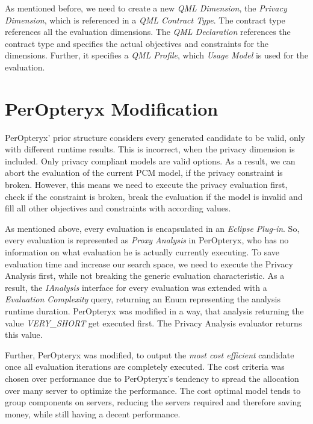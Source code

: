 As mentioned before, we need to create a new \textit{QML Dimension}, the \textit{Privacy Dimension}, which is referenced in a \textit{QML Contract Type}. The contract type references all the evaluation dimensions. The \textit{QML Declaration} references the contract type and specifies the actual objectives and constraints for the dimensions. Further, it specifies a \textit{QML Profile}, which \textit{Usage Model} is used for the evaluation.


\section{PerOpteryx Modification}

PerOpteryx' prior structure considers every generated candidate to be valid, only with different runtime results. This is incorrect, when the privacy dimension is included. Only privacy compliant models are valid options. As a result, we can abort the evaluation of the current PCM model, if the privacy constraint is broken. However, this means we need to execute the privacy evaluation first, check if the constraint is broken, break the evaluation if the model is invalid and fill all other objectives and constraints with according values.

As mentioned above, every evaluation is encapsulated in an \textit{Eclipse Plug-in}. So, every evaluation is represented as \textit{Proxy Analysis} in PerOpteryx, who has no information on what evaluation he is actually currently executing. To save evaluation time and increase our search space, we need to execute the Privacy Analysis first, while not breaking the generic evaluation characteristic. As a result, the \textit{IAnalysis} interface for every evaluation was extended with a \textit{Evaluation Complexity} query, returning an Enum representing the analysis runtime duration. PerOpteryx was modified in a way, that analysis returning the value \textit{VERY\_SHORT} get executed first. The Privacy Analysis evaluator returns this value.

Further, PerOpteryx was modified, to output the \textit{most cost efficient} candidate once all evaluation iterations are completely executed. The cost criteria was chosen over performance due to PerOpteryx's tendency to spread the allocation over many server to optimize the performance. The cost optimal model tends to group components on servers, reducing the servers required and therefore saving money, while still having a decent performance.


 

